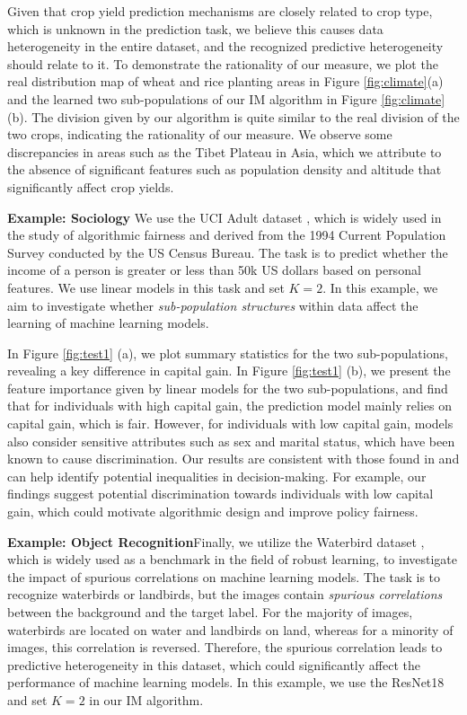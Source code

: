 Given that crop yield prediction mechanisms are closely related to crop type, which is unknown in the prediction task, we believe this causes data heterogeneity in the entire dataset, and the recognized predictive heterogeneity should relate to it. 
To demonstrate the rationality of our measure, we plot the real distribution map of wheat and rice planting areas in Figure \ref{fig:climate}(a) and the learned two sub-populations of our IM algorithm in Figure \ref{fig:climate}(b). 
The division given by our algorithm is quite similar to the real division of the two crops, indicating the rationality of our measure. 
We observe some discrepancies in areas such as the Tibet Plateau in Asia, which we attribute to the absence of significant features such as population density and altitude that significantly affect crop yields.


\textbf{Example: Sociology}\quad 
We use the UCI Adult dataset \citep{misc_adult_2}, which is widely used in the study of algorithmic fairness and derived from the 1994 Current Population Survey conducted by the US Census Bureau.
The task is to predict whether the income of a person is greater or less than 50k US dollars based on personal features.
We use linear models in this task and set $K=2$.
In this example, we aim to investigate whether \emph{sub-population structures} within data affect the learning of machine learning models.

In Figure \ref{fig:test1} (a), we plot summary statistics for the two sub-populations, revealing a key difference in capital gain.
In Figure \ref{fig:test1} (b), we present the feature importance given by linear models for the two sub-populations, and find that for individuals with high capital gain, the prediction model mainly relies on capital gain, which is fair.
However, for individuals with low capital gain, models also consider sensitive attributes such as sex and marital status, which have been known to cause discrimination.
Our results are consistent with those found in \citep{zhao2021comparing} and can help identify potential inequalities in decision-making.
For example, our findings suggest potential discrimination towards individuals with low capital gain, which could motivate algorithmic design and improve policy fairness.

\textbf{Example: Object Recognition}\quad Finally, we utilize the Waterbird dataset \citep{sagawa2019distributionally}, which is widely used as a benchmark in the field of robust learning, to investigate the impact of spurious correlations on machine learning models.
The task is to recognize waterbirds or landbirds, but the images contain \emph{spurious correlations} between the background and the target label. 
For the majority of images, waterbirds are located on water and landbirds on land, whereas for a minority of images, this correlation is reversed. 
Therefore, the spurious correlation leads to predictive heterogeneity in this dataset, which could significantly affect the performance of machine learning models.
In this example, we use the ResNet18 and set $K=2$ in our IM algorithm.

